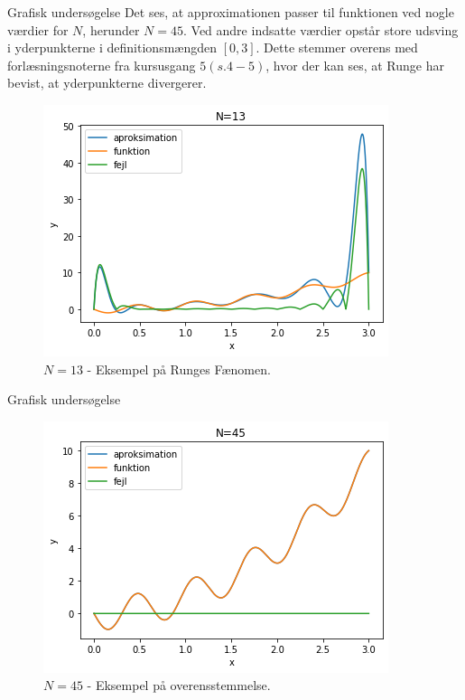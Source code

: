 
\begin{frame}{Grafisk undersøgelse}
    Det ses, at approximationen passer til funktionen ved nogle værdier for $N$, herunder $N = 45$. 
    Ved andre indsatte værdier opstår store udsving i yderpunkterne i definitionsmængden $[0,3]$.
    Dette stemmer overens med forlæsningsnoterne fra kursusgang $5(s.4-5)$, hvor der kan ses, at Runge har bevist, at yderpunkterne divergerer.
    \begin{figure}[h!]
    \begin{center}
    \includegraphics[scale=0.5]{images/N=13.png}
    \end{center}
    \caption{$N = 13$ - Eksempel på Runges Fænomen.}
    \end{figure} 
\end{frame}

\begin{frame}{Grafisk undersøgelse}
    \begin{figure}[h!]
    \begin{center}
    \includegraphics[scale=0.5]{images/N=45.png}
    \end{center}
    \caption{$N = 45$ - Eksempel på overensstemmelse.}
    \end{figure}
\end{frame}

